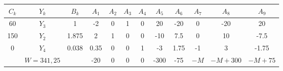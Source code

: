     \begin{tabular}{cccccccccccc}
    \hline
    \hline
    $C_k$   & $Y_k$   & $B_k$   & $A_1$   & $A_2$   & $A_3$   & $A_4$   & $A_5$   & $A_6$   & $A_7$   & $A_8$   & $A_9$ \bigstrut\\
    \hline
    60      & $Y_3$   & 1       & -2      & 0       & 1       & 0       & 20      & -20     & 0       & -20     & 20 \bigstrut[t]\\
    150     & $Y_2$   & 1.875   & 2       & 1       & 0       & 0       & -10     & 7.5     & 0       & 10      & -7.5 \\
    0       & $Y_4$   & 0.038   & 0.35    & 0       & 0       & 1       & -3      & 1.75    & -1      & 3       & -1.75 \bigstrut[b]\\
    \hline
            & $W=341,25$ &         & -20     & 0       & 0       & 0       & -300    & -75     & $-M$    & $-M+300$ & $-M+75$ \bigstrut\\
    \hline
    \hline
    \end{tabular}%
